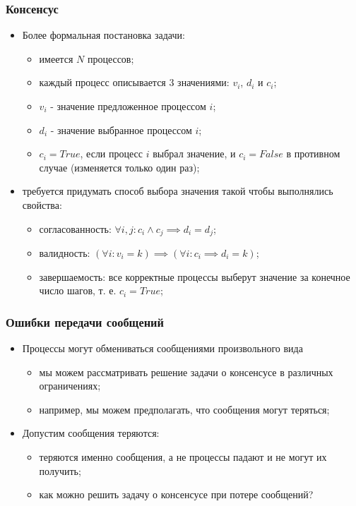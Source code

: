 \begin{frame}
\frametitle{Консенсус}
\begin{itemize}
  \item<1-> Более формальная постановка задачи:
    \begin{itemize}
      \item имеется $N$ процессов;
      \item каждый процесс описывается 3 значениями: $v_i$, $d_i$ и $c_i$;
      \item $v_i$ - значение предложенное процессом $i$;
      \item $d_i$ - значение выбранное процессом $i$;
      \item $c_i = True$, если процесс $i$ выбрал значение, и $c_i = False$ в противном случае (изменяется только один раз);
    \end{itemize}
  \item<2-> требуется придумать способ выбора значения такой чтобы выполнялись свойства:
    \begin{itemize}
      \item согласованность: $\forall i,j : c_i \land c_j \implies d_i = d_j$;
      \item валидность: $\left(\forall i : v_i = k\right) \implies \left(\forall i : c_i \implies d_i = k\right)$;
      \item завершаемость: все корректные процессы выберут значение за конечное число шагов, т. е. $c_i = True$;
    \end{itemize}
\end{itemize}
\end{frame}

\begin{frame}
\frametitle{Ошибки передачи сообщений}
\begin{itemize}
  \item<1-> Процессы могут обмениваться сообщениями произвольного вида
    \begin{itemize}
      \item мы можем рассматривать решение задачи о консенсусе в различных ограничениях;
      \item например, мы можем предполагать, что сообщения могут теряться;
    \end{itemize}
  \item<2-> Допустим сообщения теряются:
    \begin{itemize}
      \item теряются именно сообщения, а не процессы падают и не могут их получить;
      \item как можно решить задачу о консенсусе при потере сообщений?
    \end{itemize}
\end{itemize}
\end{frame}

